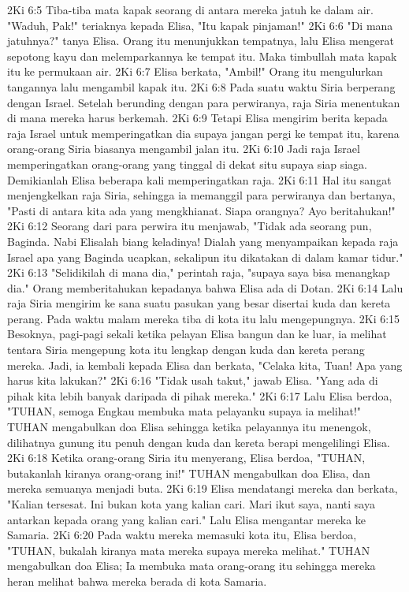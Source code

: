 2Ki 6:5  Tiba-tiba mata kapak seorang di antara mereka jatuh ke dalam air. "Waduh, Pak!" teriaknya kepada Elisa, "Itu kapak pinjaman!"
2Ki 6:6  "Di mana jatuhnya?" tanya Elisa. Orang itu menunjukkan tempatnya, lalu Elisa mengerat sepotong kayu dan melemparkannya ke tempat itu. Maka timbullah mata kapak itu ke permukaan air.
2Ki 6:7  Elisa berkata, "Ambil!" Orang itu mengulurkan tangannya lalu mengambil kapak itu.
2Ki 6:8  Pada suatu waktu Siria berperang dengan Israel. Setelah berunding dengan para perwiranya, raja Siria menentukan di mana mereka harus berkemah.
2Ki 6:9  Tetapi Elisa mengirim berita kepada raja Israel untuk memperingatkan dia supaya jangan pergi ke tempat itu, karena orang-orang Siria biasanya mengambil jalan itu.
2Ki 6:10  Jadi raja Israel memperingatkan orang-orang yang tinggal di dekat situ supaya siap siaga. Demikianlah Elisa beberapa kali memperingatkan raja.
2Ki 6:11  Hal itu sangat menjengkelkan raja Siria, sehingga ia memanggil para perwiranya dan bertanya, "Pasti di antara kita ada yang mengkhianat. Siapa orangnya? Ayo beritahukan!"
2Ki 6:12  Seorang dari para perwira itu menjawab, "Tidak ada seorang pun, Baginda. Nabi Elisalah biang keladinya! Dialah yang menyampaikan kepada raja Israel apa yang Baginda ucapkan, sekalipun itu dikatakan di dalam kamar tidur."
2Ki 6:13  "Selidikilah di mana dia," perintah raja, "supaya saya bisa menangkap dia." Orang memberitahukan kepadanya bahwa Elisa ada di Dotan.
2Ki 6:14  Lalu raja Siria mengirim ke sana suatu pasukan yang besar disertai kuda dan kereta perang. Pada waktu malam mereka tiba di kota itu lalu mengepungnya.
2Ki 6:15  Besoknya, pagi-pagi sekali ketika pelayan Elisa bangun dan ke luar, ia melihat tentara Siria mengepung kota itu lengkap dengan kuda dan kereta perang mereka. Jadi, ia kembali kepada Elisa dan berkata, "Celaka kita, Tuan! Apa yang harus kita lakukan?"
2Ki 6:16  "Tidak usah takut," jawab Elisa. "Yang ada di pihak kita lebih banyak daripada di pihak mereka."
2Ki 6:17  Lalu Elisa berdoa, "TUHAN, semoga Engkau membuka mata pelayanku supaya ia melihat!" TUHAN mengabulkan doa Elisa sehingga ketika pelayannya itu menengok, dilihatnya gunung itu penuh dengan kuda dan kereta berapi mengelilingi Elisa.
2Ki 6:18  Ketika orang-orang Siria itu menyerang, Elisa berdoa, "TUHAN, butakanlah kiranya orang-orang ini!" TUHAN mengabulkan doa Elisa, dan mereka semuanya menjadi buta.
2Ki 6:19  Elisa mendatangi mereka dan berkata, "Kalian tersesat. Ini bukan kota yang kalian cari. Mari ikut saya, nanti saya antarkan kepada orang yang kalian cari." Lalu Elisa mengantar mereka ke Samaria.
2Ki 6:20  Pada waktu mereka memasuki kota itu, Elisa berdoa, "TUHAN, bukalah kiranya mata mereka supaya mereka melihat." TUHAN mengabulkan doa Elisa; Ia membuka mata orang-orang itu sehingga mereka heran melihat bahwa mereka berada di kota Samaria.
